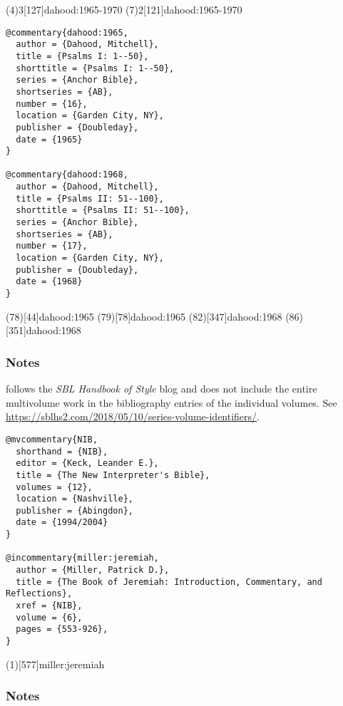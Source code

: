 \documentclass[a4paper]{article}
\begin{document}
\examplevolcite(4){3}[127]{dahood:1965-1970}
\examplevolcite(7){2}[121]{dahood:1965-1970}
\exampleabbreviations
\examplebibliography

\newrefsection

\begin{verbatim}
@commentary{dahood:1965,
  author = {Dahood, Mitchell},
  title = {Psalms I: 1--50},
  shorttitle = {Psalms I: 1--50},
  series = {Anchor Bible},
  shortseries = {AB},
  number = {16},
  location = {Garden City, NY},
  publisher = {Doubleday},
  date = {1965}
}

@commentary{dahood:1968,
  author = {Dahood, Mitchell},
  title = {Psalms II: 51--100},
  shorttitle = {Psalms II: 51--100},
  series = {Anchor Bible},
  shortseries = {AB},
  number = {17},
  location = {Garden City, NY},
  publisher = {Doubleday},
  date = {1968}
}
\end{verbatim}

\examplecite(78)[44]{dahood:1965}
\examplecite(79)[78]{dahood:1965}
\examplecite(82)[347]{dahood:1968}
\examplecite(86)[351]{dahood:1968}
\exampleabbreviations
\examplebibliography

\subsubsection{Notes}

 follows the \emph{SBL Handbook of Style} blog and does
not include the entire multivolume work in the bibliography entries of the
individual volumes. See
\url{https://sblhs2.com/2018/05/10/series-volume-identifiers/}.

\newrefsection

\begin{verbatim}
@mvcommentary{NIB,
  shorthand = {NIB},
  editor = {Keck, Leander E.},
  title = {The New Interpreter's Bible},
  volumes = {12},
  location = {Nashville},
  publisher = {Abingdon},
  date = {1994/2004}
}

@incommentary{miller:jeremiah,
  author = {Miller, Patrick D.},
  title = {The Book of Jeremiah: Introduction, Commentary, and Reflections},
  xref = {NIB},
  volume = {6},
  pages = {553-926},
}
\end{verbatim}

\examplecite(1)[577]{miller:jeremiah}
\exampleabbreviations
\examplebibliography

\subsubsection{Notes}
\end{document}
